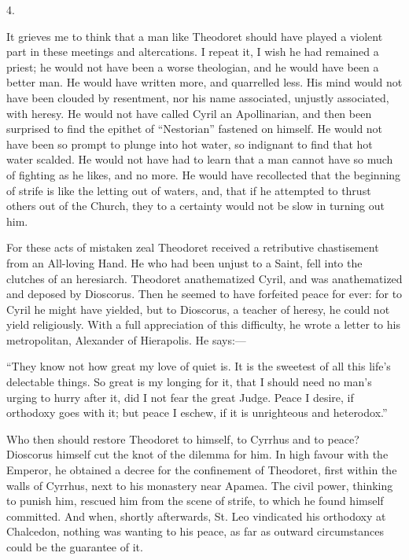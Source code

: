 4.

It grieves me to think that a man like Theodoret should have played
a violent part in these meetings and altercations. I repeat it, I wish
he had remained a priest; he would not have been a worse theologian,
and he would have been a better man. He would have written more, and
quarrelled less. His mind would not have been clouded by resentment,
nor his name associated, unjustly associated, with heresy. He would
not have called Cyril an Apollinarian, and then been surprised to find
the epithet of ``Nestorian'' fastened on himself. He would not
have been so prompt to plunge into hot water, so indignant to find
that hot water scalded. He would not have had to learn that a man
cannot have so much of fighting as he likes, and no more. He would
have recollected that the beginning of strife is like the letting out
of waters, and, that if he attempted to thrust others out of the
Church, they to a certainty would not be slow in turning out him.

For these acts of mistaken zeal Theodoret received a retributive
chastisement from an All-loving Hand. He who had been unjust to a
Saint, fell into the clutches of an heresiarch. Theodoret
anathematized Cyril, and was anathematized and deposed by Dioscorus.
Then he seemed to have forfeited peace for ever: for to Cyril he might
have yielded, but to Dioscorus, a teacher of heresy, he could not
yield religiously. With a full appreciation of this difficulty, he
wrote a letter to his metropolitan, Alexander of Hierapolis. He says:—

``They know not how great my love of quiet is. It is the
sweetest of all this life's delectable things. So great is my longing
for it, that I should need no man's urging to hurry after it, did I
not fear the great Judge. Peace I desire, if orthodoxy goes with it;
but peace I eschew, if it is unrighteous and heterodox.''

Who then should restore Theodoret to himself, to Cyrrhus and to
peace? Dioscorus himself cut the knot of the dilemma for him. In high
favour with the Emperor, he obtained a decree for the confinement of
Theodoret, first within the walls of Cyrrhus, next to his monastery
near Apamea. The civil power, thinking to punish him, rescued him from
the scene of strife, to which he found himself committed. And when,
shortly afterwards, St. Leo vindicated his orthodoxy at Chalcedon,
nothing was wanting to his peace, as far as outward circumstances
could be the guarantee of it.


